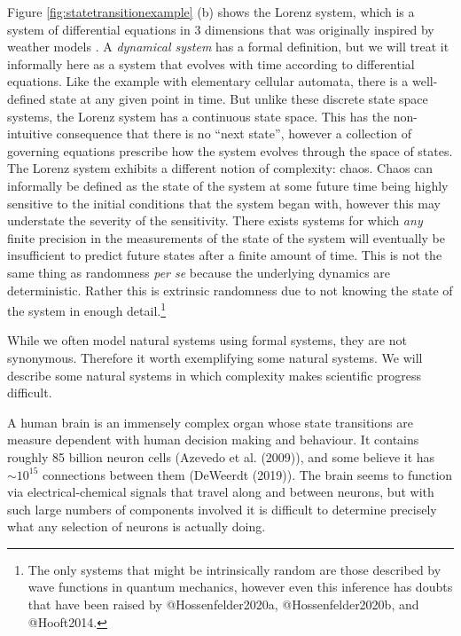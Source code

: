 \documentclass[
  letterpaper,
  DIV=11,
  numbers=noendperiod]{scrreprt}
\begin{document}
Figure \ref{fig:statetransitionexample} (b) shows the Lorenz system,
which is a system of differential equations in 3 dimensions that was
originally inspired by weather models \cite{Lorenz1963}. A
\emph{dynamical system} has a formal definition, but we will treat it
informally here as a system that evolves with time according to
differential equations. Like the example with elementary cellular
automata, there is a well-defined state at any given point in time. But
unlike these discrete state space systems, the Lorenz system has a
continuous state space. This has the non-intuitive consequence that
there is no ``next state'', however a collection of governing equations
prescribe how the system evolves through the space of states. The Lorenz
system exhibits a different notion of complexity: chaos. Chaos can
informally be defined as the state of the system at some future time
being highly sensitive to the initial conditions that the system began
with, however this may understate the severity of the sensitivity. There
exists systems for which \emph{any} finite precision in the measurements
of the state of the system will eventually be insufficient to predict
future states after a finite amount of time. This is not the same thing
as randomness \emph{per se} because the underlying dynamics are
deterministic. Rather this is extrinsic randomness due to not knowing
the state of the system in enough
detail.\footnote{The only systems that might be intrinsically random are those described by wave functions in quantum mechanics, however even this inference has doubts that have been raised by @Hossenfelder2020a, @Hossenfelder2020b, and @Hooft2014.}

While we often model natural systems using formal systems, they are not
synonymous. Therefore it worth exemplifying some natural systems. We
will describe some natural systems in which complexity makes scientific
progress difficult.

A human brain is an immensely complex organ whose state transitions are
measure dependent with human decision making and behaviour. It contains
roughly 85 billion neuron cells (Azevedo et al. (2009)), and some
believe it has \(\sim 10^{15}\) connections between them (DeWeerdt
(2019)). The brain seems to function via electrical-chemical signals
that travel along and between neurons, but with such large numbers of
components involved it is difficult to determine precisely what any
selection of neurons is actually doing.
\end{document}
